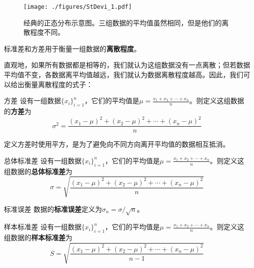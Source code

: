 


\begin{figure}[ht]
\centering
\texttt{[image: ./figures/StDevi\_1.pdf]}
\caption{经典的正态分布示意图。三组数据的平均值虽然相同，但是他们的离散程度不同。} \label{StDevi_fig1}
\end{figure}

标准差和方差用于衡量一组数据的\textbf{离散程度}。

直观地，如果所有数据都是相等的，我们就认为这组数据没有一点离散；但若数据平均值不变，各数据离平均值越远，我们就认为数据离散程度越高。因此，我们可以给出衡量离散程度的式子：

\begin{definition}{方差}\label{StDevi_def1}
设有一组数据$\{x_i\}_{i=1}^n$，它们的平均值是$\mu=\frac{x_1+x_2+\cdots+x_n}{n}$。则定义这组数据的\textbf{方差}为
\begin{equation}\label{StDevi_eq1}
\sigma^2 = \frac{(x_1-\mu)^2+(x_2-\mu)^2+\cdots+(x_n-\mu)^2}{n}
\end{equation}
\end{definition}

定义方差时使用平方，是为了避免向不同方向离开平均值的数据相互抵消。

\begin{definition}{总体标准差}
设有一组数据$\{x_i\}_{i=1}^n$，它们的平均值是$\mu=\frac{x_1+x_2+\cdots+x_n}{n}$。则定义这组数据的\textbf{总体标准差}为
\begin{equation}
\sigma = \sqrt{\frac{(x_1-\mu)^2+(x_2-\mu)^2+\cdots+(x_n-\mu)^2}{n}}
\end{equation}
\end{definition}

\begin{definition}{标准误差}
数据的\textbf{标准误差}定义为$\sigma_n=\sigma/\sqrt{n}$。
\end{definition}





\begin{definition}{样本标准差}
设有一组数据$\{x_i\}_{i=1}^n$，它们的平均值是$\mu=\frac{x_1+x_2+\cdots+x_n}{n}$。则定义这组数据的\textbf{样本标准差}为
\begin{equation}
S = \sqrt{\frac{(x_1-\mu)^2+(x_2-\mu)^2+\cdots+(x_n-\mu)^2}{n-1}}
\end{equation}
\end{definition}


